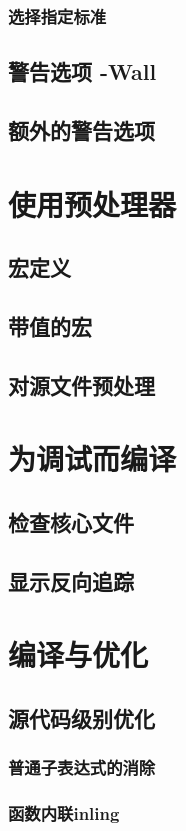 \documentclass[lang=cn,10pt,newtx,scheme=chinese]{elegantbook}
\begin{document}
\subsection{选择指定标准}
\section{警告选项 -Wall}
\section{额外的警告选项}

\chapter{使用预处理器}
\section{宏定义}
\section{带值的宏}
\section{对源文件预处理}

\chapter{为调试而编译}
\section{检查核心文件}
\section{显示反向追踪}

\chapter{编译与优化}
\section{源代码级别优化}
\subsection{普通子表达式的消除}
\subsection{函数内联inling}
\end{document}
